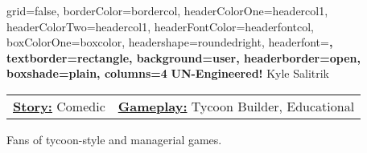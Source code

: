 \documentclass[archE1,portrait]{baposter}
\begin{document}
\background{ %

}

\begin{poster}
{
	grid=false,
	borderColor=bordercol, %
	headerColorOne=headercol1, %
	headerColorTwo=headercol1, %
	headerFontColor=headerfontcol, %
	boxColorOne=boxcolor, %
	headershape=roundedright, %
	headerfont=\Large\sf\bf, %
	textborder=rectangle,
	background=user,
	headerborder=open, %
	boxshade=plain,
	columns=4
}
{}
%
%
{
\sf\bf UN-Engineered!} %
{\vspace{.5em} Kyle Salitrik\\ %
} %
%




{ 
	\begin{tabularx}{\textwidth}{ X | X }
	\underline{\textbf{Story:}} Comedic & \underline{\textbf{Gameplay:}} Tycoon Builder, Educational
	\end{tabularx}
	\vspace*{-.6\baselineskip}
}


{ 
	Fans of tycoon-style and managerial games.
}


\end{poster}
\end{document}
